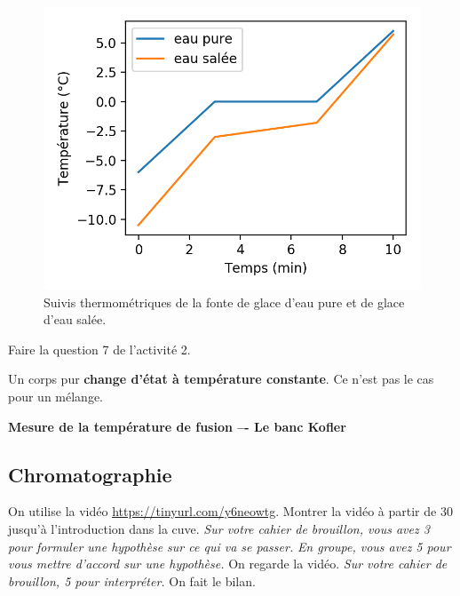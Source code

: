 \begin{figure}[h]
\center
\includegraphics[scale=0.75]{images/fusion.png}
\caption{Suivis thermométriques de la fonte de glace d'eau pure et de glace d'eau salée.}
\end{figure}

\begin{prior}
Faire la question 7 de l'activité 2.
\end{prior}

\begin{definition}
Un corps pur \textbf{change d'état à température constante}.
Ce n'est pas le cas pour un mélange.
\end{definition}

\begin{slide}
\textbf{Mesure de la température de fusion –- Le banc Kofler}
\end{slide}

\subsection{Chromatographie}

\begin{prior}
On utilise la vidéo \href{https://tinyurl.com/y6neowtg}{https://tinyurl.com/y6neowtg}.
Montrer la vidéo à partir de \unit{30}{\second} jusqu'à l'introduction dans la cuve.
\emph{Sur votre cahier de brouillon, vous avez \unit{3}{\minute} pour formuler une hypothèse sur ce qui va se passer.}
\emph{En groupe, vous avez \unit{5}{\minute} pour vous mettre d'accord sur une hypothèse.}
On regarde la vidéo.
\emph{Sur votre cahier de brouillon, \unit{5}{\minute} pour interpréter.}
On fait le bilan.
\end{prior}


